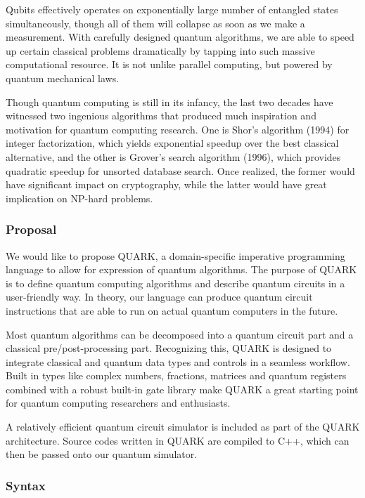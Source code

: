 \documentclass[]{article}
\begin{document}
Qubits effectively operates on exponentially large number of entangled
states simultaneously, though all of them will collapse as soon as we
make a measurement. With carefully designed quantum algorithms, we are
able to speed up certain classical problems dramatically by tapping into
such massive computational resource. It is not unlike parallel
computing, but powered by quantum mechanical laws.

Though quantum computing is still in its infancy, the last two decades
have witnessed two ingenious algorithms that produced much inspiration
and motivation for quantum computing research. One is Shor's algorithm
(1994) for integer factorization, which yields exponential speedup over
the best classical alternative, and the other is Grover's search
algorithm (1996), which provides quadratic speedup for unsorted database
search. Once realized, the former would have significant impact on
cryptography, while the latter would have great implication on NP-hard
problems.

\subsubsection{Proposal}\label{proposal}

We would like to propose QUARK, a domain-specific imperative programming
language to allow for expression of quantum algorithms. The purpose of
QUARK is to define quantum computing algorithms and describe quantum
circuits in a user-friendly way. In theory, our language can produce
quantum circuit instructions that are able to run on actual quantum
computers in the future.

Most quantum algorithms can be decomposed into a quantum circuit part
and a classical pre/post-processing part. Recognizing this, QUARK is
designed to integrate classical and quantum data types and controls in a
seamless workflow. Built in types like complex numbers, fractions,
matrices and quantum registers combined with a robust built-in gate
library make QUARK a great starting point for quantum computing
researchers and enthusiasts.

A relatively efficient quantum circuit simulator is included as part of
the QUARK architecture. Source codes written in QUARK are compiled to
C++, which can then be passed onto our quantum simulator.

\subsubsection{Syntax}\label{syntax}
\end{document}
